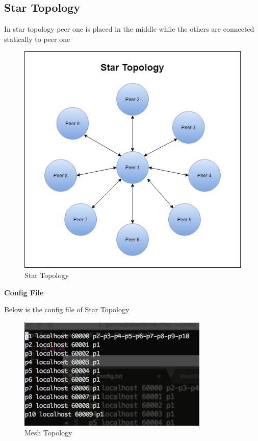 \documentclass{article}
\begin{document}
\subsection{Star Topology}
In star topology peer one is placed in the middle while the others are connected statically to peer one
\begin{figure} [H]
\centering
        \includegraphics[totalheight=8cm]{starArch.png}
    \caption{Star Topology}
    \label{fig:verticalcell}
\end{figure}

\textbf{Config File}

Below is the config file of Star Topology

\begin{figure} [H]
\centering
        \includegraphics[totalheight=8cm]{Star.png}
    \caption{Mesh Topology}
    \label{fig:verticalcell}
\end{figure}
\end{document}
